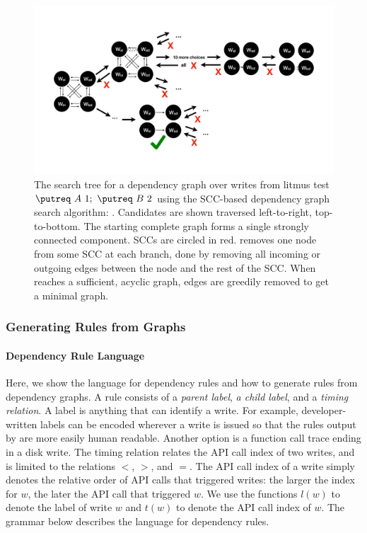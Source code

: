 \begin{figure}
  \centering
  \includegraphics[clip,trim=0cm 3cm 0cm 3cm,width=0.9\linewidth,page=2]{graph-search-graphics.pdf}
  \caption{The search tree for a dependency graph over writes from litmus test
           $ \putreq\ A\ 1;\ \putreq\ B\ 2$ using
           the SCC-based dependency graph search algorithm: \sccsearch.
           Candidates are shown traversed left-to-right, top-to-bottom.
           The starting complete graph forms a single strongly connected component.
           SCCs are circled in red.
           \sccsearch removes one node from some SCC at each branch, done by removing all incoming
           or outgoing edges between the node and the rest of the SCC. When \sccsearch reaches a
           sufficient, acyclic graph, edges are greedily removed to get a minimal graph.\tighten}
  \label{fig:scc-search-visual}
\end{figure}

\subsubsection{Generating Rules from Graphs}
\paragraph{Dependency Rule Language}
Here, we show the language for dependency rules and how to generate rules from dependency graphs.
A rule consists of a \textit{parent label}, \textit{a child label}, and a \textit{timing relation}.
A label is anything that can identify a write.
For example, developer-written labels can be encoded wherever a write is issued
so that the rules output by \depsynth are more easily human readable.
Another option is a function call trace ending in a disk write. %
The timing relation relates the API call index of two writes, and is limited to
the relations $<$, $>$, and $=$. The API call index of a write simply denotes
the relative order of API calls that triggered writes:
the larger the index for $w$, the later the API call that triggered $w$.
We use the functions $l(w)$ to denote the label of write $w$ and $t(w)$ to denote
the API call index of $w$.
The grammar below describes the language for dependency rules.

